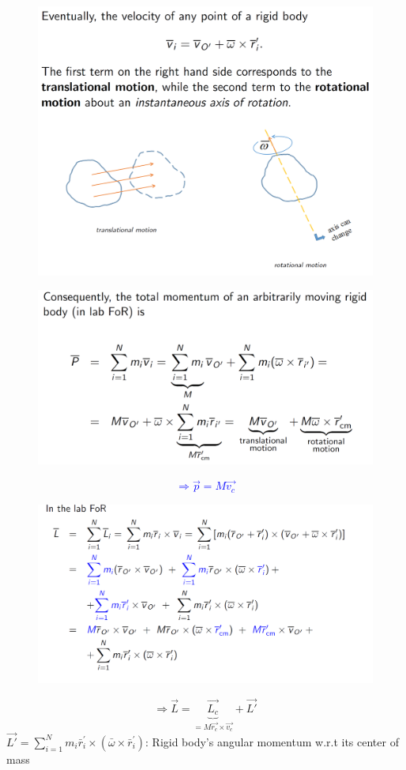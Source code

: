 \documentclass{beamer}
\begin{document}
\begin{frame}
  \begin{figure}[htbp]
  \centering
  \includegraphics[width=0.8 \linewidth, angle =0]{rigid2.png}
  \label{fig:5}
  \end{figure}
\end{frame}

\begin{frame}
  \begin{figure}[htbp]
  \centering
  \includegraphics[width=0.8 \linewidth, angle =0]{rigid3.png}
  \label{fig:6}
  \end{figure}\pause
  \textcolor{blue}{$$\Rightarrow \vec{p} = M\vec{v_c}$$}
\end{frame}

\begin{frame}
  \begin{figure}[htbp]
  \centering
  \includegraphics[width=0.7 \linewidth, angle =0]{rigid4.png}
  \label{fig:7}
  \end{figure}\pause
 $$\Rightarrow \vec{L} = \underbrace{\vec{L_c}}_{=M\vec{r_c}\times \vec{v_c}} + \vec{L'}$$\pause
 $\vec{L'} = \sum_{i=1}^{N} m_{i} \bar{r}_{i}^{\prime} \times\left(\bar{\omega} \times \bar{r}_{i}^{\prime}\right)$: Rigid body's angular momentum w.r.t its center of mass 
\end{frame}
\end{document}
